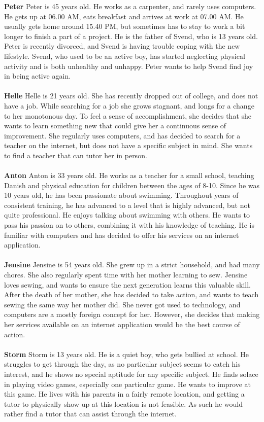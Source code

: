 \textbf{Peter}
Peter is 45 years old.
He works as a carpenter, and rarely uses computers.
He gets up at 06.00 AM, eats breakfast and arrives at work at 07.00 AM.
He usually gets home around 15.40 PM, but sometimes has to stay to work a bit longer to finish a part of a project.
He is the father of Svend, who is 13 years old.
Peter is recently divorced, and Svend is having trouble coping with the new lifestyle.
Svend, who used to be an active boy, has started neglecting physical activity and is both unhealthy and unhappy.
Peter wants to help Svend find joy in being active again. 
\\\\
\textbf{Helle}
Helle is 21 years old.
She has recently dropped out of college, and does not have a job.
While searching for a job she grows stagnant, and longs for a change to her monotonous day.
To feel a sense of accomplishment, she decides that she wants to learn something new that could give her a continuous sense of improvement.
She regularly uses computers, and has decided to search for a teacher on the internet, but does not have a specific subject in mind.
She wants to find a teacher that can tutor her in person.
\\\\
\textbf{Anton}
Anton is 33 years old.
He works as a teacher for a small school, teaching Danish and physical education for children between the ages of 8-10.
Since he was 10 years old, he has been passionate about swimming.
Throughout years of consistent training, he has advanced to a level that is highly advanced, but not quite professional.
He enjoys talking about swimming with others.
He wants to pass his passion on to others, combining it with his knowledge of teaching.
He is familiar with computers and has decided to offer his services on an internet application.
\\\\
\textbf{Jensine}
Jensine is 54 years old.
She grew up in a strict household, and had many chores.
She also regularly spent time with her mother learning to sew.
Jensine loves sewing, and wants to ensure the next generation learns this valuable skill.
After the death of her mother, she has decided to take action, and wants to teach sewing the same way her mother did.
She never got used to technology, and computers are a mostly foreign concept for her.
However, she decides that making her services available on an internet application would be the best course of action.
\\\\
\textbf{Storm}
Storm is 13 years old.
He is a quiet boy, who gets bullied at school. 
He struggles to get through the day, as no particular subject seems to catch his interest, and he shows no special aptitude for any specific subject.
He finds solace in playing video games, especially one particular game. 
He wants to improve at this game.
He lives with his parents in a fairly remote location, and getting a tutor to physically show up at this location is not feasible.
As such he would rather find a tutor that can assist through the internet.

